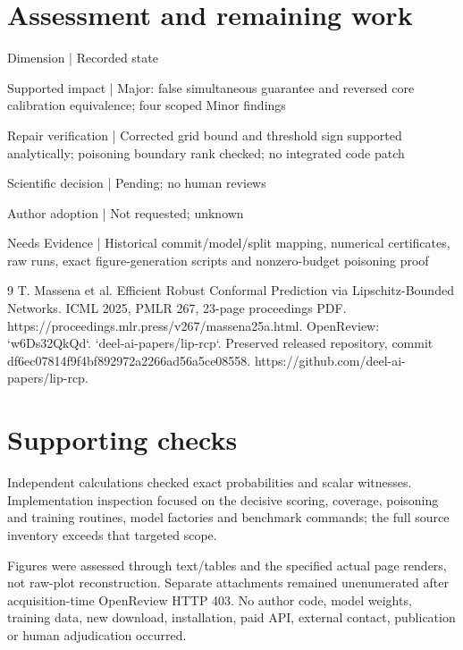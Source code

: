 \documentclass[10pt]{article}
\begin{document}
\section*{Assessment and remaining work}
Dimension | Recorded state\par
Supported impact | Major: false simultaneous guarantee and reversed core calibration equivalence; four scoped Minor findings\par
Repair verification | Corrected grid bound and threshold sign supported analytically; poisoning boundary rank checked; no integrated code patch\par
Scientific decision | Pending; no human reviews\par
Author adoption | Not requested; unknown\par
Needs Evidence | Historical commit/model/split mapping, numerical certificates, raw runs, exact figure-generation scripts and nonzero-budget poisoning proof\par
9 T. Massena et al. Efficient Robust Conformal Prediction via Lipschitz-Bounded Networks. ICML 2025, PMLR 267, 23-page proceedings PDF. https://proceedings.mlr.press/v267/massena25a.html. OpenReview: `w6Ds32QkQd`. `deel-ai-papers/lip-rcp`. Preserved released repository, commit df6ec07814f9f4bf892972a2266ad56a5ce08558. https://github.com/deel-ai-papers/lip-rcp.\par
\section*{Supporting checks}
Independent calculations checked exact probabilities and scalar witnesses. Implementation inspection focused on the decisive scoring, coverage, poisoning and training routines, model factories and benchmark commands; the full source inventory exceeds that targeted scope.\par
Figures were assessed through text/tables and the specified actual page renders, not raw-plot reconstruction. Separate attachments remained unenumerated after acquisition-time OpenReview HTTP 403. No author code, model weights, training data, new download, installation, paid API, external contact, publication or human adjudication occurred.\par
\end{document}
